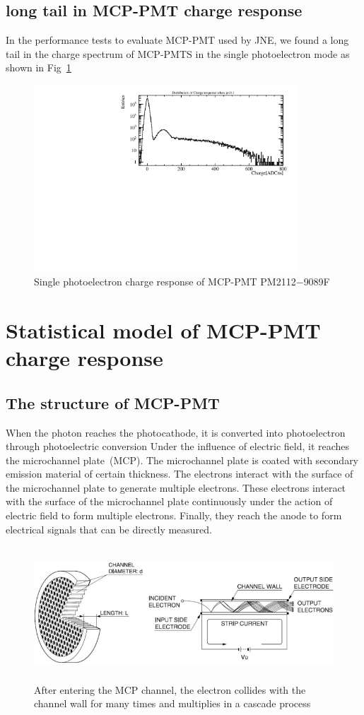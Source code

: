 \documentclass{article}
\begin{document}
\subsection{long tail in MCP-PMT charge response}\label{subsec:tail}
In the performance tests to evaluate MCP-PMT used by JNE, we found a long tail in the charge spectrum of MCP-PMTS in the single photoelectron mode as shown in Fig~\ref{fig:tail}
\begin{figure}[ht]
    \centering
    \includegraphics[height=7cm]{pic/longtail.pdf}
    \caption{Single photoelectron charge response of MCP-PMT PM2112$-$9089F}\label{fig:tail}
\end{figure}
\section{Statistical model of MCP-PMT charge response}
\subsection{The structure of MCP-PMT}\label{subsec:structure}
When the photon reaches the photocathode, it is converted into photoelectron through photoelectric conversion
Under the influence of electric field, it reaches the microchannel plate~(MCP). The microchannel plate is coated
with secondary emission material of certain thickness. The electrons interact with the surface of the microchannel plate to generate multiple electrons. 
These electrons interact with the surface of the microchannel plate continuously under the action of electric field to form multiple electrons.
Finally, they reach the anode to form electrical signals that can be directly measured.
\begin{figure}[ht]
    \centering
    \includegraphics[height=5cm]{pic/structure.pdf}
    \caption{After entering the MCP channel, the electron collides with the channel wall for many times and multiplies in a cascade process}\label{fig:structure}
\end{figure}
\end{document}
